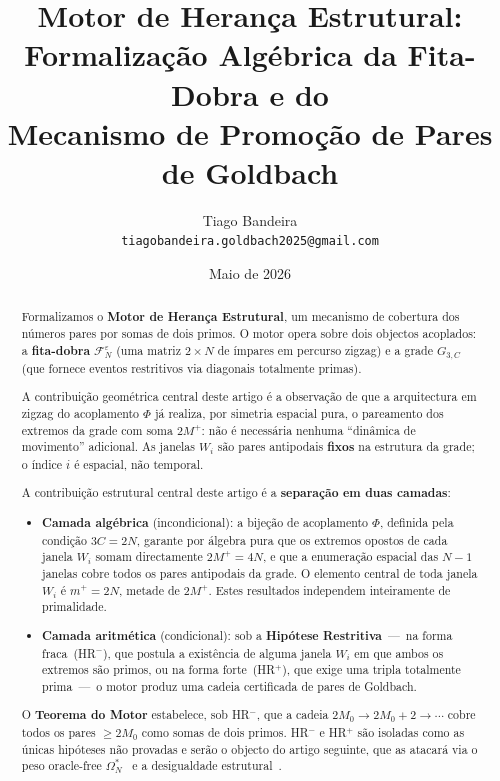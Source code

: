 \documentclass[12pt, a4paper]{article}
\title{Motor de Herança Estrutural:\\
	Formalização Algébrica da Fita-Dobra e do\\
	Mecanismo de Promoção de Pares de Goldbach}
\author{Tiago Bandeira\\
	\small\texttt{tiagobandeira.goldbach2025@gmail.com}}
\date{Maio de 2026}
\theoremstyle{plain}
\theoremstyle{definition}
\theoremstyle{remark}
\begin{document}
	
	\maketitle
	
	\begin{abstract}
		Formalizamos o \textbf{Motor de Herança Estrutural}, um mecanismo
		de cobertura dos números pares por somas de dois primos.
		O motor opera sobre dois objectos acoplados: a \textbf{fita-dobra}
		$\mathcal{F}_N^\varepsilon$ (uma matriz $2\times N$ de ímpares em
		percurso zigzag) e a grade $G_{3,C}$ (que fornece eventos restritivos
		via diagonais totalmente primas).
		
		A contribuição geométrica central deste artigo é a observação de que
		a arquitectura em zigzag do acoplamento $\Phi$ já realiza, por
		simetria espacial pura, o pareamento dos extremos da grade com soma
		$2M^+$: não é necessária nenhuma ``dinâmica de movimento'' adicional.
		As janelas $W_i$ são pares antipodais \textbf{fixos} na estrutura da
		grade; o índice $i$ é espacial, não temporal.
		
		A contribuição estrutural central deste artigo é a
		\textbf{separação em duas camadas}:
		\begin{itemize}
			\item \textbf{Camada algébrica} (incondicional): a bijeção de
			acoplamento $\Phi$, definida pela condição $3C=2N$, garante
			por álgebra pura que os extremos opostos de cada janela
			$W_i$ somam directamente $2M^+=4N$, e que a enumeração
			espacial das $N-1$ janelas cobre todos os pares antipodais
			da grade.  O elemento central de toda janela $W_i$ é
			$m^+=2N$, metade de $2M^+$.  Estes resultados independem
			inteiramente de primalidade.
			\item \textbf{Camada aritmética} (condicional): sob a
			\textbf{Hipótese Restritiva}~---~na forma fraca~(HR$^-$),
			que postula a existência de alguma janela $W_i$ em que ambos
			os extremos são primos, ou na forma forte~(HR$^+$), que
			exige uma tripla totalmente prima~---~o motor produz uma
			cadeia certificada de pares de Goldbach.
		\end{itemize}
		
		O \textbf{Teorema do Motor} estabelece, sob HR$^-$, que a cadeia
		$2M_0\to2M_0+2\to\cdots$ cobre todos os pares $\geq2M_0$ como somas
		de dois primos.  HR$^-$ e HR$^+$ são isoladas como as únicas
		hipóteses não provadas e serão o objecto do artigo seguinte, que as
		atacará via o peso oracle-free $\Omega_N^*$~\cite{peso} e a
		desigualdade estrutural~\cite{problemaB}.
	\end{abstract}
	
\end{document}
